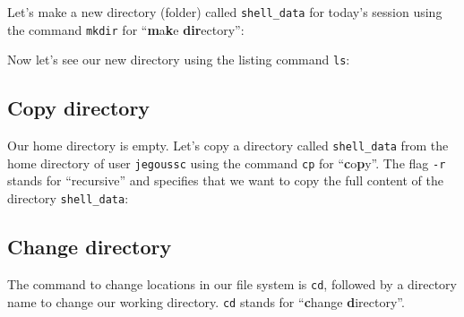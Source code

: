 \documentclass[
  letterpaper,
  DIV=11,
  numbers=noendperiod]{scrreprt}
\newenvironment{Shaded}{\begin{snugshade}}{\end{snugshade}}
\newcommand{\AttributeTok}[1]{\textcolor[rgb]{0.40,0.45,0.13}{#1}}
\newcommand{\ExtensionTok}[1]{\textcolor[rgb]{0.00,0.23,0.31}{#1}}
\newcommand{\NormalTok}[1]{\textcolor[rgb]{0.00,0.23,0.31}{#1}}
\newcommand{\PreprocessorTok}[1]{\textcolor[rgb]{0.68,0.00,0.00}{#1}}
\newcommand{\SpecialStringTok}[1]{\textcolor[rgb]{0.13,0.47,0.30}{#1}}
\begin{document}
Let's make a new directory (folder) called \texttt{shell\_data} for
today's session using the command \texttt{mkdir} for
``\textbf{m}a\textbf{k}e \textbf{dir}ectory'':

\begin{Shaded}
\end{Shaded}

Now let's see our new directory using the listing command \texttt{ls}:

\begin{Shaded}
\end{Shaded}

\subsection{Copy directory}\label{copy-directory}

Our home directory is empty. Let's copy a directory called
\texttt{shell\_data} from the home directory of user \texttt{jegoussc}
using the command \texttt{cp} for ``\textbf{c}o\textbf{p}y''. The flag
\texttt{-r} stands for ``recursive'' and specifies that we want to copy
the full content of the directory \texttt{shell\_data}:

\begin{Shaded}
\end{Shaded}

\subsection{Change directory}\label{change-directory}

The command to change locations in our file system is \texttt{cd},
followed by a directory name to change our working directory.
\texttt{cd} stands for ``\textbf{c}hange \textbf{d}irectory''.

\begin{Shaded}
\end{Shaded}
\end{document}
